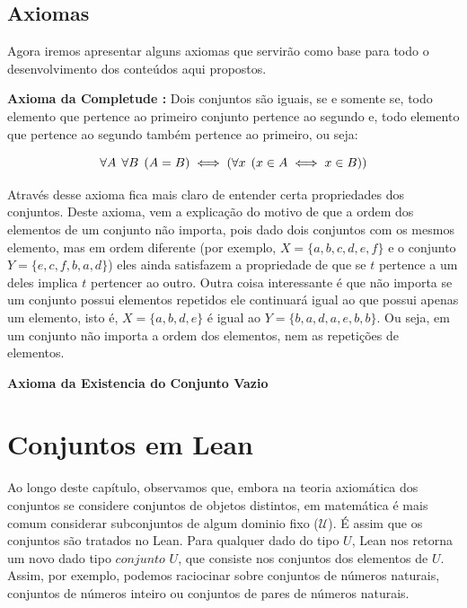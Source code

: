     \subsection{Axiomas}
    
    Agora iremos apresentar alguns axiomas que servirão como base para todo o desenvolvimento dos conteúdos aqui propostos.
    
    \textbf{Axioma da Completude :} Dois conjuntos são iguais, se e somente se, todo elemento que pertence ao primeiro conjunto pertence ao segundo e, todo elemento que pertence ao segundo também pertence ao primeiro, ou seja:
    
    \[\forall A \hspace{1.5mm} \forall B \hspace{1.5mm} (A=B) \iff (\forall x \hspace{1.5mm} (x \in A \iff x \in B))\]
    
    Através desse axioma fica mais claro de entender certa propriedades dos conjuntos. Deste axioma, vem a explicação do motivo de que a ordem dos elementos de um conjunto não importa, pois dado dois conjuntos com os mesmos elemento, mas em ordem diferente (por exemplo, $X=\{a,b,c,d,e,f\}$ e o conjunto $Y=\{e,c,f,b,a,d\}$) eles ainda satisfazem a propriedade de que se $t$ pertence a um deles implica $t$ pertencer ao outro. Outra coisa interessante é que não importa se um conjunto possui elementos repetidos ele continuará igual ao que possui apenas um elemento, isto é, $X=\{a,b,d,e\}$ é igual ao $Y=\{b,a,d,a,e,b,b\}$. Ou seja, em um conjunto não importa a ordem dos elementos, nem as repetições de elementos.
    
    \textbf{Axioma da Existencia do Conjunto Vazio}

\section{Conjuntos em Lean}
    
    Ao longo deste capítulo, observamos que, embora na teoria axiomática dos conjuntos se considere conjuntos de objetos distintos, em matemática é mais comum considerar subconjuntos de algum dominio fixo ($\mathcal U $). É assim que os conjuntos são tratados no Lean. Para qualquer dado do tipo $U$, Lean nos retorna um novo dado tipo $conjunto$ $U$, que consiste nos conjuntos dos elementos de $U$. Assim, por exemplo, podemos raciocinar sobre conjuntos de números naturais, conjuntos de números inteiro ou conjuntos de pares de números naturais.

